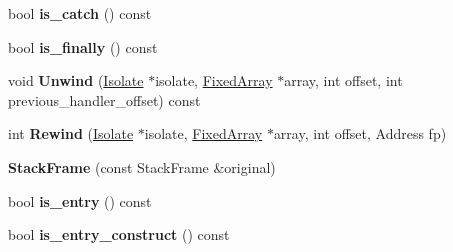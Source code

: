 \begin{DoxyCompactItemize}
\item 
\hypertarget{classv8_1_1internal_1_1_b_a_s_e___e_m_b_e_d_d_e_d_a91e38d9e75cf50cfc9f2754dc8fc9676}{}bool {\bfseries is\+\_\+catch} () const \label{classv8_1_1internal_1_1_b_a_s_e___e_m_b_e_d_d_e_d_a91e38d9e75cf50cfc9f2754dc8fc9676}

\item 
\hypertarget{classv8_1_1internal_1_1_b_a_s_e___e_m_b_e_d_d_e_d_afa07d147cc4f52b9699d2c8d60335f71}{}bool {\bfseries is\+\_\+finally} () const \label{classv8_1_1internal_1_1_b_a_s_e___e_m_b_e_d_d_e_d_afa07d147cc4f52b9699d2c8d60335f71}

\item 
\hypertarget{classv8_1_1internal_1_1_b_a_s_e___e_m_b_e_d_d_e_d_ab1dad048d5e5b2b2c95cfc92915362c3}{}void {\bfseries Unwind} (\hyperlink{classv8_1_1internal_1_1_isolate}{Isolate} $\ast$isolate, \hyperlink{classv8_1_1internal_1_1_fixed_array}{Fixed\+Array} $\ast$array, int offset, int previous\+\_\+handler\+\_\+offset) const \label{classv8_1_1internal_1_1_b_a_s_e___e_m_b_e_d_d_e_d_ab1dad048d5e5b2b2c95cfc92915362c3}

\item 
\hypertarget{classv8_1_1internal_1_1_b_a_s_e___e_m_b_e_d_d_e_d_a60d63dc40186a4932ea56d9786e2e2de}{}int {\bfseries Rewind} (\hyperlink{classv8_1_1internal_1_1_isolate}{Isolate} $\ast$isolate, \hyperlink{classv8_1_1internal_1_1_fixed_array}{Fixed\+Array} $\ast$array, int offset, Address fp)\label{classv8_1_1internal_1_1_b_a_s_e___e_m_b_e_d_d_e_d_a60d63dc40186a4932ea56d9786e2e2de}

\item 
\hypertarget{classv8_1_1internal_1_1_b_a_s_e___e_m_b_e_d_d_e_d_ab5844e07cd342a6f01c374cf1fd97460}{}{\bfseries Stack\+Frame} (const Stack\+Frame \&original)\label{classv8_1_1internal_1_1_b_a_s_e___e_m_b_e_d_d_e_d_ab5844e07cd342a6f01c374cf1fd97460}

\item 
\hypertarget{classv8_1_1internal_1_1_b_a_s_e___e_m_b_e_d_d_e_d_aee04e4b60e7679a5fc6e954052704102}{}bool {\bfseries is\+\_\+entry} () const \label{classv8_1_1internal_1_1_b_a_s_e___e_m_b_e_d_d_e_d_aee04e4b60e7679a5fc6e954052704102}

\item 
\hypertarget{classv8_1_1internal_1_1_b_a_s_e___e_m_b_e_d_d_e_d_a6b7a9b087e698e428cdc796e8e8ffc2b}{}bool {\bfseries is\+\_\+entry\+\_\+construct} () const \label{classv8_1_1internal_1_1_b_a_s_e___e_m_b_e_d_d_e_d_a6b7a9b087e698e428cdc796e8e8ffc2b}


\end{DoxyCompactItemize}
